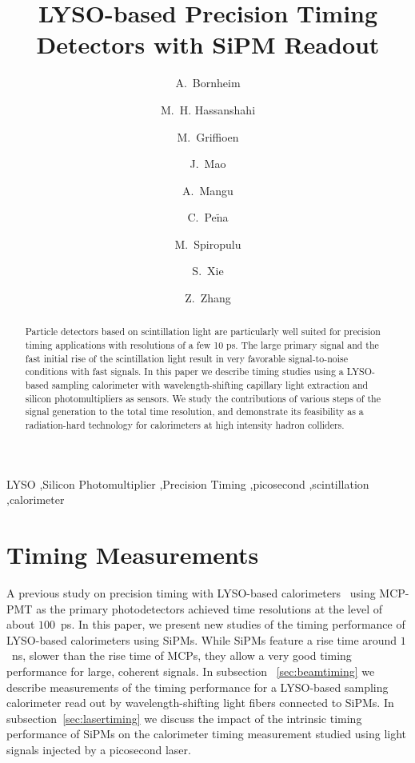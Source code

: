 \documentclass[preprint,1p]{elsarticle}
\begin{document}
  
\linenumbers

\begin{frontmatter}

\title{LYSO-based Precision Timing Detectors with SiPM Readout}

\author[1]{A.~Bornheim}
\author[2]{M.~H. Hassanshahi}
\author[1]{M.~Griffioen}
\author[1]{J.~Mao}
\author[1]{A.~Mangu}
\author[1]{C.~Pe$\tilde{\mathrm{n}}$a}
\author[1]{M.~Spiropulu}
\author[1]{S.~Xie }
\author[1]{Z.~Zhang}
\address[1]{California Institute of Technology, Pasadena, CA, USA}
\address[2]{Institute for Research in Fundamental Science, Tehran, Iran}


\begin{abstract}
Particle detectors based on scintillation light are particularly well suited for precision timing applications with 
resolutions of a few 10 ps. The large primary signal and the fast initial rise of the scintillation
light result in very favorable signal-to-noise conditions with fast signals. In this paper we describe timing 
studies using a LYSO-based sampling calorimeter with wavelength-shifting capillary light extraction and silicon
photomultipliers as sensors. We study the contributions of various steps of the signal generation to 
the total time resolution, and demonstrate its feasibility as a radiation-hard technology for calorimeters
at high intensity hadron colliders.
\end{abstract}

\begin{keyword}
LYSO \sep Silicon Photomultiplier \sep Precision Timing \sep picosecond \sep scintillation \sep calorimeter
\end{keyword}

\end{frontmatter}

%
%

%
%
  
%
%
  
%
%

\section{Timing Measurements} 

A previous study on precision timing with LYSO-based calorimeters~\cite{Anderson:2015gha} 
using MCP-PMT as the primary photodetectors achieved
time resolutions at the level of about $100$~ps. In this paper, we present new
studies of the timing performance of LYSO-based calorimeters using SiPMs. While
SiPMs feature a rise time around $1$~ns, slower than the rise time of MCPs, they
allow a very good timing performance for large, coherent signals. In subsection
~\ref{sec:beamtiming} we describe measurements of the timing performance for a
LYSO-based sampling calorimeter read out by wavelength-shifting light fibers
connected to SiPMs. In subsection~\ref{sec:lasertiming} we discuss the impact of
the intrinsic timing performance of SiPMs on the calorimeter timing measurement
studied using light signals injected by a picosecond laser.
\end{document}
